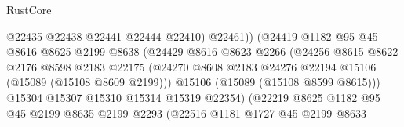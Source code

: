 \begin{lexlean}{RustCore}
\begin{coremodule}
                                          @22435
                                          @22438
                                          @22441
                                          @22444
                                          @22410)
                                        @22461))
                                    (@24419
                                      @1182
                                      @95
                                      @45
                                      @8616
                                      @8625
                                      @2199
                                      @8638
                                      (@24429
                                        @8616
                                        @8623
                                        @2266
                                        (@24256
                                          @8615
                                          @8622
                                          @2176
                                          @8598
                                          @2183
                                          @22175
                                          (@24270
                                            @8608
                                            @2183
                                            @24276
                                            @22194
                                            @15106
                                            (@15089 (@15108 @8609 @2199)))
                                          @15106
                                          (@15089 (@15108 @8599 @8615)))
                                        @15304
                                        @15307
                                        @15310
                                        @15314
                                        @15319
                                        @22354)
                                      (@22219
                                        @8625
                                        @1182
                                        @95
                                        @45
                                        @2199
                                        @8635
                                        @2199
                                        @2293
                                        (@22516
                                          @1181
                                          @1727
                                          @45
                                          @2199
                                          @8633

\end{coremodule}
\end{lexlean}
